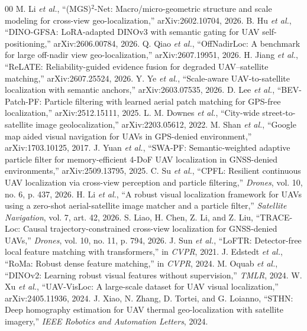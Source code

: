 \documentclass[conference]{IEEEtran}
\begin{document}
\begin{thebibliography}{00}
 M. Li \textit{et al.}, ``(MGS)$^2$-Net: Macro/micro-geometric
structure and scale modeling for cross-view geo-localization,'' arXiv:2602.10704, 2026.
 B. Hu \textit{et al.}, ``DINO-GFSA: LoRA-adapted DINOv3 with
semantic gating for UAV self-positioning,'' arXiv:2606.00784, 2026.
 Q. Qiao \textit{et al.}, ``OffNadirLoc: A benchmark for large
off-nadir view geo-localization,'' arXiv:2607.19951, 2026.
 H. Jiang \textit{et al.}, ``ReLATE: Reliability-guided evidence
fusion for degraded UAV--satellite matching,'' arXiv:2607.25524, 2026.
 Y. Ye \textit{et al.}, ``Scale-aware UAV-to-satellite
localization with semantic anchors,'' arXiv:2603.07535, 2026.
 D. Lee \textit{et al.}, ``BEV-Patch-PF: Particle filtering
with learned aerial patch matching for GPS-free localization,'' arXiv:2512.15111, 2025.
 L. M. Downes \textit{et al.}, ``City-wide street-to-satellite
image geolocalization,'' arXiv:2203.05612, 2022.
 M. Shan \textit{et al.}, ``Google map aided visual navigation for
UAVs in GPS-denied environment,'' arXiv:1703.10125, 2017.
 J. Yuan \textit{et al.}, ``SWA-PF: Semantic-weighted adaptive
particle filter for memory-efficient 4-DoF UAV localization in GNSS-denied
environments,'' arXiv:2509.13795, 2025.
 C. Su \textit{et al.}, ``CPFL: Resilient continuous UAV
localization via cross-view perception and particle filtering,''
\textit{Drones}, vol. 10, no. 6, p. 437, 2026.
 H. Li \textit{et al.}, ``A robust visual localization
framework for UAVs using a zero-shot aerial-satellite image matcher and a
particle filter,'' \textit{Satellite Navigation}, vol. 7, art. 42, 2026.
 S. Liao, H. Chen, Z. Li, and Z. Liu, ``TRACE-Loc: Causal
trajectory-constrained cross-view localization for GNSS-denied UAVs,''
\textit{Drones}, vol. 10, no. 11, p. 794, 2026.
 J. Sun \textit{et al.}, ``LoFTR: Detector-free local feature
matching with transformers,'' in \textit{CVPR}, 2021.
 J. Edstedt \textit{et al.}, ``RoMa: Robust dense feature
matching,'' in \textit{CVPR}, 2024.
 M. Oquab \textit{et al.}, ``DINOv2: Learning robust visual
features without supervision,'' \textit{TMLR}, 2024.
 W. Xu \textit{et al.}, ``UAV-VisLoc: A large-scale dataset
for UAV visual localization,'' arXiv:2405.11936, 2024.
 J. Xiao, N. Zhang, D. Tortei, and G. Loianno, ``STHN: Deep
homography estimation for UAV thermal geo-localization with satellite
imagery,'' \textit{IEEE Robotics and Automation Letters}, 2024.
\end{thebibliography}
\end{document}
